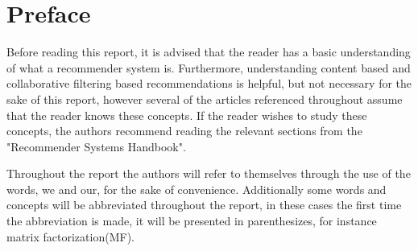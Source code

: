 \chapter*{Preface}
Before reading this report, it is advised that the reader has a basic understanding of what a recommender system is. Furthermore, understanding content based and collaborative filtering based recommendations is helpful, but not necessary for the sake of this report, however several of the articles referenced throughout assume that the reader knows these concepts. If the reader wishes to study these concepts, the authors recommend reading the relevant sections from the "Recommender Systems Handbook"\cite{recsyshandbook}.

Throughout the report the authors will refer to themselves through the use of the words, we and our, for the sake of convenience. Additionally some words and concepts will be abbreviated throughout the report, in these cases the first time the abbreviation is made, it will be presented in parenthesizes, for instance matrix factorization(MF).


